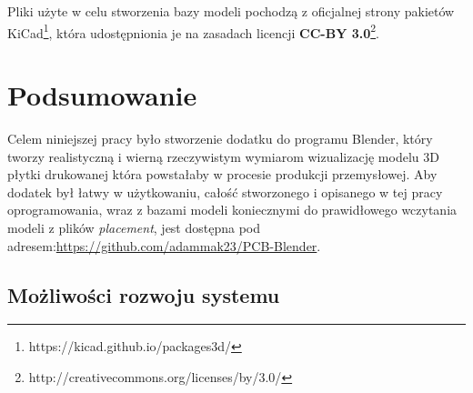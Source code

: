 \documentclass[brudnopis]{xmgr}
\begin{document}
\vspace{5mm}
\noindent Pliki użyte w celu stworzenia bazy modeli pochodzą z oficjalnej strony pakietów KiCad\footnote{https://kicad.github.io/packages3d/}, która udostępnionia je na zasadach licencji \textbf{CC-BY 3.0}\footnote{http://creativecommons.org/licenses/by/3.0/}.
\vspace{5mm}





\chapter{Podsumowanie}
Celem niniejszej pracy było stworzenie dodatku do programu Blender, który tworzy realistyczną i wierną rzeczywistym wymiarom wizualizację modelu 3D płytki drukowanej która powstałaby w procesie produkcji przemysłowej.
Aby dodatek był łatwy w użytkowaniu, całość stworzonego i opisanego w tej pracy oprogramowania, wraz z bazami modeli koniecznymi do prawidłowego wczytania modeli z plików \emph{placement}, jest dostępna pod adresem:\newline\url{https://github.com/adammak23/PCB-Blender}.


\section{Możliwości rozwoju systemu}
\end{document}
